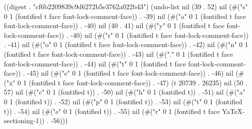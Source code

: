 
((digest . "cf6b2209839c9d6272b5e3762a022b43") (undo-list nil (39 . 52) nil (#("s" 0 1 (fontified t face font-lock-comment-face)) . -39) nil (#("a" 0 1 (fontified t face font-lock-comment-face)) . -40) nil (40 . 41) nil (#("y" 0 1 (fontified t face font-lock-comment-face)) . -40) nil (#("r" 0 1 (fontified t face font-lock-comment-face)) . -41) nil (#("o" 0 1 (fontified t face font-lock-comment-face)) . -42) nil (#("n" 0 1 (fontified t face font-lock-comment-face)) . -43) nil (#("." 0 1 (fontified t face font-lock-comment-face)) . -44) nil (#("t" 0 1 (fontified t face font-lock-comment-face)) . -45) nil (#("e" 0 1 (fontified t face font-lock-comment-face)) . -46) nil (#("x" 0 1 (fontified t face font-lock-comment-face)) . -47) (t 20739 . 26235) nil (50 . 57) nil (#("c" 0 1 (fontified t)) . -50) nil (#("h" 0 1 (fontified t)) . -51) nil (#("a" 0 1 (fontified t)) . -52) nil (#("p" 0 1 (fontified t)) . -53) nil (#("t" 0 1 (fontified t)) . -54) nil (#("e" 0 1 (fontified t)) . -55) nil (#("r" 0 1 (fontified t face YaTeX-sectioning-1)) . -56)))
